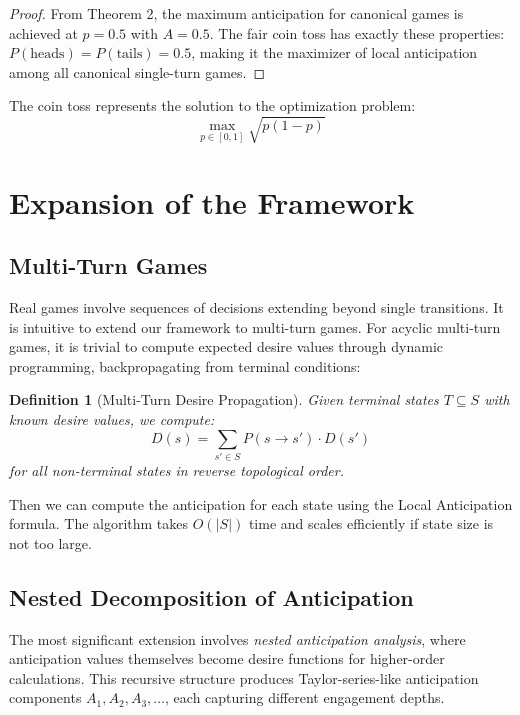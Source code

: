 \documentclass{article}
\newtheorem{definition}{Definition}
\begin{document}
\begin{proof}
From Theorem 2, the maximum anticipation for canonical games is achieved at $p = 0.5$ with $A = 0.5$. The fair coin toss has exactly these properties: $P(\text{heads}) = P(\text{tails}) = 0.5$, making it the maximizer of local anticipation among all canonical single-turn games.
\end{proof}

The coin toss represents the solution to the optimization problem:
$$\max_{p \in [0,1]} \sqrt{p(1-p)}$$



\section{Expansion of the Framework}
\subsection{Multi-Turn Games}

Real games involve sequences of decisions extending beyond single transitions. It is intuitive to extend our framework to multi-turn games.
For acyclic multi-turn games, it is trivial to compute expected desire values through dynamic programming, backpropagating from terminal conditions:

\begin{definition}[Multi-Turn Desire Propagation]
Given terminal states $T \subseteq S$ with known desire values, we compute:
\begin{equation}
D(s) = \sum_{s' \in S} P(s \to s') \cdot D(s')
\end{equation}
for all non-terminal states in reverse topological order.
\end{definition}

Then we can compute the anticipation for each state using the Local Anticipation formula. The algorithm takes $O(|S|)$ time and scales efficiently if state size is not too large.

\subsection{Nested Decomposition of Anticipation}

The most significant extension involves \emph{nested anticipation analysis}, where anticipation values themselves become desire functions for higher-order calculations. This recursive structure produces Taylor-series-like anticipation components $A_1, A_2, A_3, \ldots$, each capturing different engagement depths.
\end{document}
